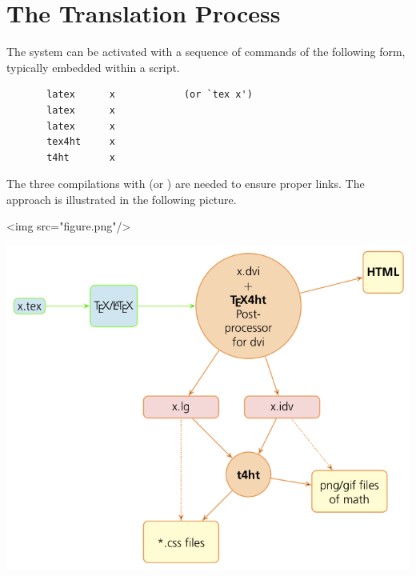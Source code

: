 
\chapter{The Translation Process}
The system can be activated with a sequence of
commands of the following form, typically embedded within a script.

\begin{verbatim}
       latex      x            (or `tex x')
       latex      x
       latex      x
       tex4ht     x
       t4ht       x
\end{verbatim}


The three compilations with \latex (or \tex) are needed to ensure
proper links.  The approach is illustrated in the following picture.

\ifhtml
 \Tg<img src="figure.png"/>
\else
 \begin{center}
  \includegraphics{figure.png}
 \end{center}
\fi

